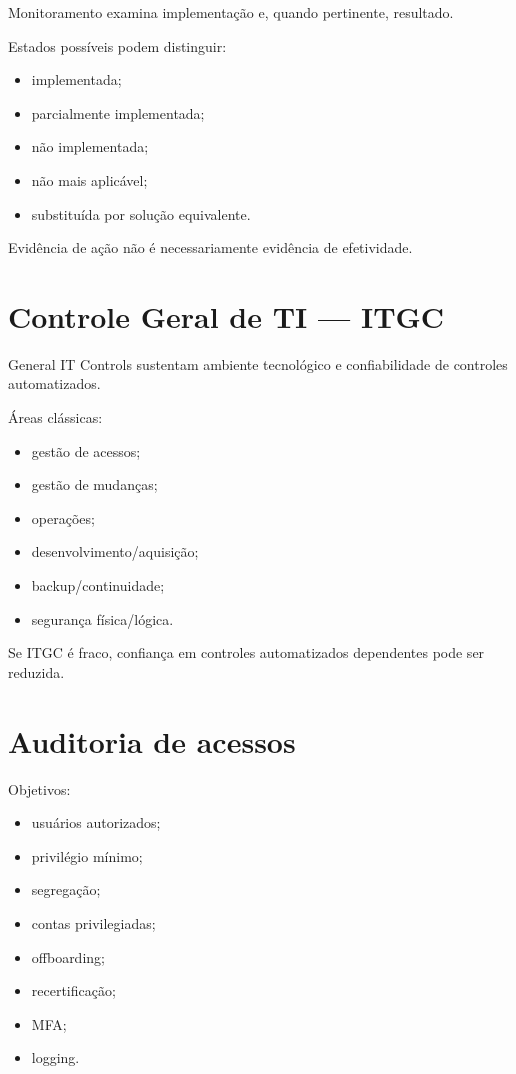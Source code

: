 Monitoramento examina implementação e, quando pertinente, resultado.

Estados possíveis podem distinguir:
\begin{itemize}
\item implementada;
\item parcialmente implementada;
\item não implementada;
\item não mais aplicável;
\item substituída por solução equivalente.
\end{itemize}

Evidência de ação não é necessariamente evidência de efetividade.

\section{Controle Geral de TI — ITGC}

General IT Controls sustentam ambiente tecnológico e confiabilidade de controles automatizados.

Áreas clássicas:
\begin{itemize}
\item gestão de acessos;
\item gestão de mudanças;
\item operações;
\item desenvolvimento/aquisição;
\item backup/continuidade;
\item segurança física/lógica.
\end{itemize}

Se ITGC é fraco, confiança em controles automatizados dependentes pode ser reduzida.

\section{Auditoria de acessos}

Objetivos:
\begin{itemize}
\item usuários autorizados;
\item privilégio mínimo;
\item segregação;
\item contas privilegiadas;
\item offboarding;
\item recertificação;
\item MFA;
\item logging.
\end{itemize}

